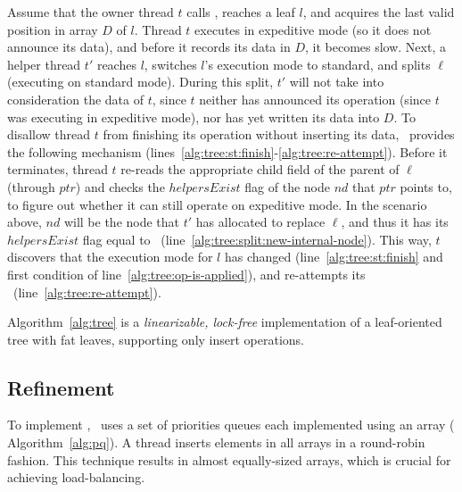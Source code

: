     Assume that the owner thread $t$ calls \TreeInsert,
    reaches a leaf $\mathit{l}$, and acquires the last valid position in array $D$ of $\mathit{l}$. 
    Thread $t$ executes in expeditive mode (so it does not announce its data),
    and before it records its data in $D$, it becomes slow. Next, a helper thread $t'$ reaches $\mathit{l}$, switches 
    $\mathit{l}$'s execution mode to standard, and splits $\ell$ (executing on standard mode). 
    During this split, $t'$ will not take into 
    consideration the data of $t$, since $t$ neither has announced its operation
    (since $t$ was executing in expeditive mode), nor has yet written its data into $D$. 
    To disallow thread $t$ from finishing its operation without inserting its data, \TreeInsert\ provides the 
    following mechanism (lines~\ref{alg:tree:st:finish}-\ref{alg:tree:re-attempt}). Before it terminates, 
    thread $t$ re-reads the appropriate child field of the parent of $\ell$ (through $\mathit{ptr}$) 
    and checks the $\mathit{helpersExist}$ flag of the node $nd$ that $\mathit{ptr}$ points to,
    to figure out whether it can still operate on expeditive mode. In the scenario above, 
    $nd$ will be the node that $t'$ has allocated to replace $\ell$, and thus it has its 
    $\mathit{helpersExist}$ flag equal to \True\ (line~\ref{alg:tree:split:new-internal-node}). 
    This way, $t$ discovers that the execution mode for $\mathit{l}$ has changed
    (line~\ref{alg:tree:st:finish} and first condition of line~\ref{alg:tree:op-is-applied}),
    and re-attempts its \Insert\ (line~\ref{alg:tree:re-attempt}).
        
    \begin{lemma}
    \label{lem:tree}
    Algorithm~\ref{alg:tree} is a {\em linearizable, lock-free} implementation of a leaf-oriented
    tree with fat leaves, supporting only insert operations.
    \end{lemma}

    \subsection{Refinement}

    To implement \RS, \Fresh\ uses a set of priorities queues
    each implemented using an array ( Algorithm~\ref{alg:pq}). 
    A thread inserts elements in all arrays in a round-robin fashion. 
    This technique results in almost equally-sized arrays, which is crucial
    for achieving load-balancing. 
    
